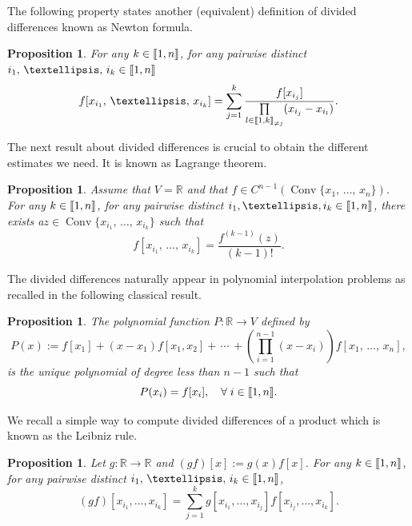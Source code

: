 \documentclass[11pt]{article}
\newtheorem{prop}[theo]{Proposition}
\theoremstyle{definition}
\numberwithin{equation}{section}
\numberwithin{figure}{section}
\numberwithin{table}{section}
\DeclareMathOperator{\Conv}{Conv}
\newcommand{\llbracket}{\mathopen{[\mkern -2.7mu[}}
\newcommand{\rrbracket}{\mathclose{]\mkern -2.7mu]}}
\newcommand{\inter}[2]{\llbracket #1,#2 \rrbracket}
\newcommand{\interexclu}[3]{\llbracket #1,#2\rrbracket_{\neq #3}}
\newcommand{\R}{\mathbb{R}}
\let\oldforall\forall
\renewcommand*{\forall}{\mathrel{\oldforall}}
\begin{document}
The following property states another (equivalent) definition of divided differences known as Newton formula.

\begin{prop}\label{Prop:DifferencesDiviseesNewton}
For any $k \in \inter{1}{n}$, for any pairwise distinct $i_1,\,\dots,\,i_k \linebreak \in \inter{1}{n}$
\[
f[x_{i_1},\,\dots,\,x_{i_k}] = \sum_{j=1}^k \frac{f[x_{i_j}]}{\prod\limits_{l\in \interexclu{1}{k}{j}} (x_{i_j}- x_{i_l})}.
\]
\end{prop}

The next result about divided differences is crucial to obtain the different estimates we need. It is known as Lagrange theorem.

\begin{prop}\label{Prop:DifferencesDiviseesLagrange}
Assume that $V\!=\!\R$ and that $f \in C^{n-1} \left(\Conv \{ x_1,\,\dots,\,x_n \} \right)$. For any $k \in \inter{1}{n}$, for any pairwise distinct $i_1, \dots, i_k \in \inter{1}{n} $, there exists a\linebreak$z \in \Conv \{ x_{i_1},\,\dots,\,x_{i_k} \}$ such that
\[
f[x_{i_1},\,\dots,\,x_{i_k}] = \frac{f^{(k-1)}(z)}{(k-1)!}.
\]
\end{prop}


The divided differences naturally appear in polynomial interpolation problems as recalled in the following classical result.
\begin{prop}
The polynomial function $P:\R\to V$ defined by
\begin{equation}\label{lagrange_poly}
P(x) := f[x_1] + (x-x_1) f[x_1,x_2] +\,\dotsm \,+ \left(\prod_{i=1}^{n-1} (x-x_i) \right) f[x_1,\,\dotsc,\,x_n],
\end{equation}
is the unique polynomial of degree less than $n-1$ such that
\begin{equation}\label{interpolation_property}
P(x_i)=f[x_i], \quad \forall i\in \inter{1}{n}.
\end{equation}
\end{prop}

We recall a simple way to compute divided differences of a product which is known as the Leibniz rule.

\begin{prop}\label{Prop:DifferencesDiviseesLeibniz}
Let $g : \R \to \R$ and $(gf)[x] := g(x) f[x]$. For any $k \in \inter{1}{n}$, for any pairwise distinct $i_1,\,\dots,\,i_k \in \inter{1}{n}$,
\[
(gf)[x_{i_1}, \dots, x_{i_k}] = \sum_{j=1}^k g[x_{i_1}, \dots, x_{i_j}] f[x_{i_j}, \dots, x_{i_k}].
\]
\end{prop}
\end{document}
